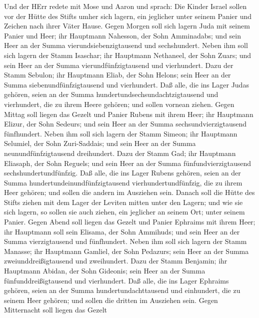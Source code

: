  Und der HErr redete mit Mose und Aaron und sprach:
 Die Kinder Israel sollen vor der Hütte des Stifts umher
sich lagern, ein jeglicher unter seinem Panier und Zeichen nach ihrer
Väter Hause.  Gegen Morgen soll sich lagern Juda mit seinem
Panier und Heer; ihr Hauptmann Nahesson, der Sohn Amminadabs;
 und sein Heer an der Summa vierundsiebenzigtausend und
sechshundert.  Neben ihm soll sich lagern der Stamm
Isaschar; ihr Hauptmann Nethaneel, der Sohn Zuars;  und sein
Heer an der Summa vierundfünfzigtausend und vierhundert. 
Dazu der Stamm Sebulon; ihr Hauptmann Eliab, der Sohn Helons;
 sein Heer an der Summa siebenundfünfzigtausend und
vierhundert.  Daß alle, die ins Lager Judas gehören, seien
an der Summa hundertundsechsundachtzigtausend und vierhundert, die zu
ihrem Heere gehören; und sollen vornean ziehen.  Gegen
Mittag soll liegen das Gezelt und Panier Rubens mit ihrem Heer; ihr
Hauptmann Elizur, der Sohn Sedeurs;  und sein Heer an der
Summa sechsundvierzigtausend fünfhundert.  Neben ihm soll
sich lagern der Stamm Simeon; ihr Hauptmann Selumiel, der Sohn
Zuri-Saddais;  und sein Heer an der Summa
neunundfünfzigtausend dreihundert.  Dazu der Stamm Gad; ihr
Hauptmann Eliasaph, der Sohn Reguels;  und sein Heer an der
Summa fünfundvierzigtausend sechshundertundfünfzig.  Daß
alle, die ins Lager Rubens gehören, seien an der Summa
hundertundeinundfünfzigtausend vierhundertundfünfzig, die zu ihrem Heer
gehören; und sollen die andern im Ausziehen sein.  Danach
soll die Hütte des Stifts ziehen mit dem Lager der Leviten mitten unter
den Lagern; und wie sie sich lagern, so sollen sie auch ziehen, ein
jeglicher an seinem Ort; unter seinem Panier.  Gegen Abend
soll liegen das Gezelt und Panier Ephraims mit ihrem Heer; ihr Hauptmann
soll sein Elisama, der Sohn Ammihuds;  und sein Heer an der
Summa vierzigtausend und fünfhundert.  Neben ihm soll sich
lagern der Stamm Manasse; ihr Hauptmann Gamliel, der Sohn Pedazurs;
 sein Heer an der Summa zweiunddreißigtausend und
zweihundert.  Dazu der Stamm Benjamin; ihr Hauptmann
Abidan, der Sohn Gideonis;  sein Heer an der Summa
fünfunddreißigtausend und vierhundert.  Daß alle, die ins
Lager Ephraims gehören, seien an der Summa hundertundachttausend und
einhundert, die zu seinem Heer gehören; und sollen die dritten im
Ausziehen sein.  Gegen Mitternacht soll liegen das Gezelt
